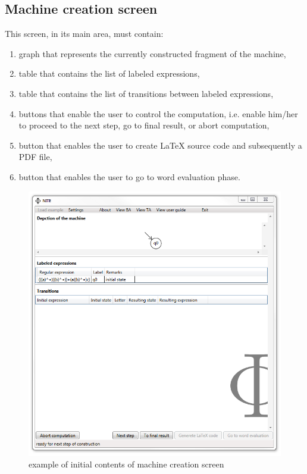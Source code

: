 \documentclass{article}
\begin{document}
\subsection{Machine creation screen}
This screen, in its main area, must contain:
\begin{enumerate}

  \item graph that represents the currently constructed fragment of the machine,

  \item table that contains the list of labeled expressions,

  \item table that contains the list of transitions between labeled expressions,

  \item buttons that enable the user to control the computation, i.e. enable him/her to proceed to
  the next step, go to final result, or abort computation,

  \item button that enables the user to create \LaTeX{} source code and subsequently a PDF file,

  \item button that enables the user to go to word evaluation phase.

\end{enumerate}

\begin{figure}[ht!]
  \centering
  \includegraphics[width=.9\textwidth]{../../graphics/Screen3.png}
  \caption{example of initial contents of machine creation screen}
\end{figure}
\end{document}
